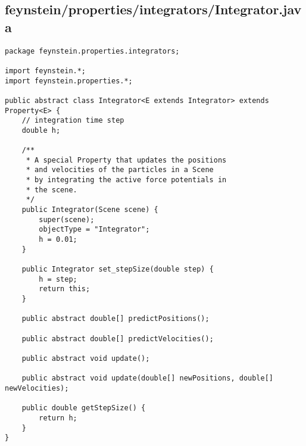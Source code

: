 \subsection*{feynstein/properties/integrators/Integrator.java}
\begin{lstlisting}
package feynstein.properties.integrators;

import feynstein.*;
import feynstein.properties.*;

public abstract class Integrator<E extends Integrator> extends Property<E> {
    // integration time step
	double h;
	
	/**
	 * A special Property that updates the positions
	 * and velocities of the particles in a Scene
	 * by integrating the active force potentials in
	 * the scene.
	 */
    public Integrator(Scene scene) {
		super(scene);
		objectType = "Integrator";
		h = 0.01;
    }

    public Integrator set_stepSize(double step) {
		h = step;
		return this;
    }
    
    public abstract double[] predictPositions();

    public abstract double[] predictVelocities();

    public abstract void update();

    public abstract void update(double[] newPositions, double[] newVelocities);

    public double getStepSize() {
		return h;
    }
}\end{lstlisting}


